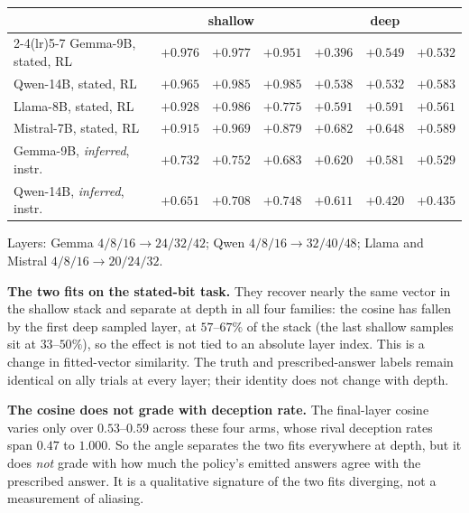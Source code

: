 \documentclass{article}
\begin{document}
\begin{center}
\footnotesize
\begin{tabular}{lcccccc}
\toprule
 & \multicolumn{3}{c}{shallow} & \multicolumn{3}{c}{deep} \\
\cmidrule(lr){2-4}\cmidrule(lr){5-7}
Gemma-9B, stated, RL & $+0.976$ & $+0.977$ & $+0.951$ & $+0.396$ & $+0.549$ & $+0.532$ \\
Qwen-14B, stated, RL & $+0.965$ & $+0.985$ & $+0.985$ & $+0.538$ & $+0.532$ & $+0.583$ \\
Llama-8B, stated, RL & $+0.928$ & $+0.986$ & $+0.775$ & $+0.591$ & $+0.591$ & $+0.561$ \\
Mistral-7B, stated, RL & $+0.915$ & $+0.969$ & $+0.879$ & $+0.682$ & $+0.648$ & $+0.589$ \\
Gemma-9B, \emph{inferred}, instr. & $+0.732$ & $+0.752$ & $+0.683$ & $+0.620$ & $+0.581$ & $+0.529$ \\
Qwen-14B, \emph{inferred}, instr. & $+0.651$ & $+0.708$ & $+0.748$ & $+0.611$ & $+0.420$ & $+0.435$ \\
\bottomrule
\end{tabular}
\end{center}
{\footnotesize Layers: Gemma $4/8/16 \to 24/32/42$; Qwen $4/8/16 \to 32/40/48$; Llama and Mistral
$4/8/16 \to 20/24/32$.}

\textbf{The two fits on the stated-bit task.} They recover nearly the same vector in the shallow stack and
separate at depth in all four families: the cosine has fallen by the first deep sampled layer, at $57$--$67\%$ of the stack (the last shallow samples sit at $33$--$50\%$), so the effect is not
tied to an absolute layer index. This is a change in fitted-vector similarity. The truth and prescribed-answer labels remain identical on ally trials at every layer; their identity does not change with depth.

\textbf{The cosine does not grade with deception rate.} The final-layer cosine
varies only over $0.53$--$0.59$ across these four arms, whose rival deception rates span $0.47$ to $1.000$.
So the angle separates the two fits everywhere at depth, but it does \emph{not} grade with how much the
policy's emitted answers agree with the prescribed answer. It is a qualitative signature of the two fits diverging, not a
measurement of aliasing.
\end{document}
